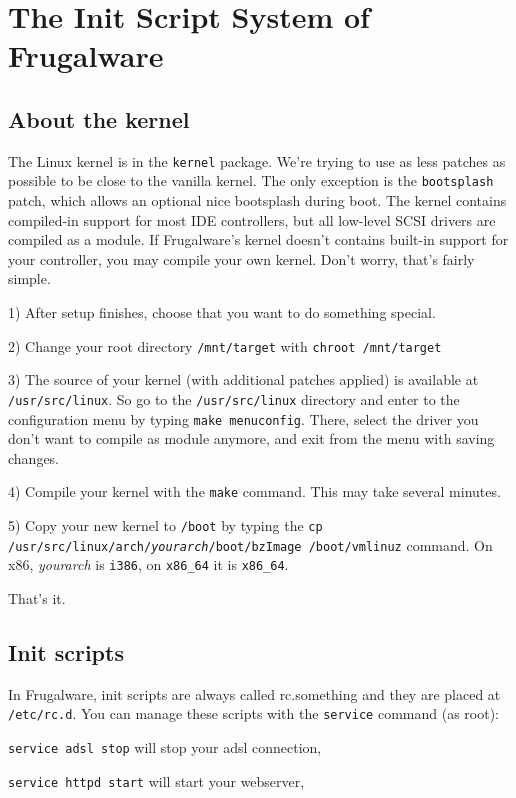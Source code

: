 \chapter{The Init Script System of Frugalware}
\label{chap:init}
\section{About the kernel}

The Linux kernel is in the {\tt kernel} package. We're trying to use as less patches as possible to be close to the vanilla kernel. The only exception is the {\tt bootsplash} patch, which allows an optional nice bootsplash during boot. The kernel contains compiled-in support for most IDE controllers, but all low-level SCSI drivers are compiled as a module. If Frugalware's kernel doesn't contains built-in support for your controller, you may compile your own kernel. Don't worry, that's fairly simple.

1) After setup finishes, choose that you want to do something special.

2) Change your root directory {\tt /mnt/target} with {\tt chroot /mnt/target}

3) The source of your kernel (with additional patches applied) is available at {\tt /usr/src/linux}. So go to the {\tt/usr/src/linux} directory and enter to the configuration menu by typing {\tt make menuconfig}. There, select the driver you don't want to compile as module anymore, and exit from the menu with saving changes.

4) Compile your kernel with the {\tt make} command. This may take several minutes.

5) Copy your new kernel to {\tt /boot} by typing the
{\tt cp /usr/src/linux/arch/\textit{yourarch}/boot/bzImage /boot/vmlinuz}
command. On x86, \textit{yourarch} is {\tt i386}, on {\tt x86_64} it is
{\tt x86_64}.

That's it.

\section{Init scripts}

In Frugalware, init scripts are always called rc.something and they are placed
at {\tt /etc/rc.d}. You can manage these scripts with the {\tt service} command
(as root):

{\tt service adsl stop} will stop your adsl connection,

{\tt service httpd start} will start your webserver,

